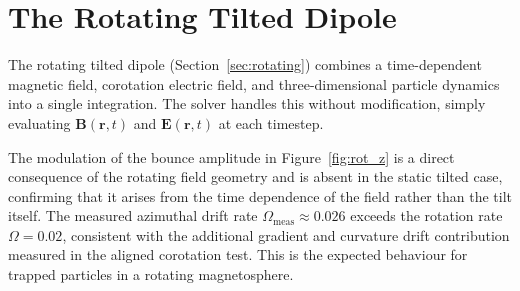 \section{The Rotating Tilted Dipole}
\label{sec:disc_rotating}

The rotating tilted dipole (Section~\ref{sec:rotating}) combines a time-dependent magnetic field, corotation electric field, and three-dimensional particle dynamics into a single integration. The solver handles this without modification, simply evaluating $\mathbf{B}(\mathbf{r}, t)$ and $\mathbf{E}(\mathbf{r}, t)$ at each timestep.

The modulation of the bounce amplitude in Figure~\ref{fig:rot_z} is a direct consequence of the rotating field geometry and is absent in the static tilted case, confirming that it arises from the time dependence
of the field rather than the tilt itself. The measured azimuthal drift rate $\Omega_\mathrm{meas} \approx 0.026$ exceeds the rotation rate $\Omega = 0.02$, consistent with the additional gradient and curvature drift contribution measured in the aligned corotation test. This is the expected behaviour for trapped particles in a rotating magnetosphere.